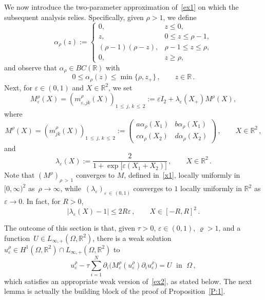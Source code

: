 \documentclass[AHL,Unicode,longabstracts,published]{cedram}
\newcommand{\bbR}{\mathbb{R}}
\begin{document}
We now introduce the two-parameter approximation of~\eqref{ex1} on which the subsequent analysis relies. Specifically, given $\rho>1$, we define
\begin{equation*}
\alpha_\rho(z):=
\left\{
\begin{array}{clll}
0, &z\leq 0,\\
z, &0\leq z\leq \rho-1,\\
(\rho-1)(\rho-z), &\rho-1\leq z\leq \rho,\\
0, &z\geq\rho,
\end{array}
\right.
\end{equation*}
and observe that $\alpha_\rho\in BC(\bbR)$ with
\begin{equation*}
0\le \alpha_\rho(z)\le \min\{\rho, z_+\}\,, \qquad z\in\bbR\,.
\end{equation*}
Next, for $\varepsilon\in (0,1)$ and $X\in\bbR^2$, we set
\begin{equation*}
M_{\varepsilon}^\rho(X) = \left(m_{\varepsilon, jk}^\rho(X)\right)_{1\,\le\,j,\,k\,\le\,2}:= \varepsilon I_2 + \lambda_\varepsilon(X_{+}) M^\rho(X),
\end{equation*}
where
\begin{equation}\label{momar}
M^\rho(X) = \left(m_{jk}^\rho(X)\right)_{1\,\le\, j,\,k\,\le\,2} :=
\begin{pmatrix}
a\alpha_\rho(X_1) & b\alpha_\rho(X_1) \\
c\alpha_\rho(X_2) & d\alpha_\rho(X_2)
\end{pmatrix}\,, \qquad X\in\bbR^2\,,
\end{equation}
and
\begin{equation*}
\lambda_\varepsilon(X) := \frac{2}{1+\exp{[\varepsilon (X_1+X_2)}]}\,, \qquad X\in\bbR^2\,.
\end{equation*}
Note that $(M^\rho)_{\rho\,>\,1}$ converges to $M$, defined in~\eqref{x1}, locally uniformly in $[0,\infty)^2$ as~$\rho\to\infty$, while~$(\lambda_\varepsilon)_{\varepsilon\,\in\,(0,1)}$ converges to $1$ locally uniformly in $\bbR^2$ as $\varepsilon\to 0$. In fact, for $R>0$,
\begin{equation}\label{UL}
|\lambda_\varepsilon(X) - 1| \le 2 R \varepsilon\,, \qquad X\in [-R,R]^2\,. 
\end{equation}

The outcome of this section is that, given $\tau>0$, $\varepsilon\in (0,1)$, $\varrho>1$, and a function~$U\in L_{\infty,+}(\Omega,\bbR^2)$, there is a weak solution $u_\varepsilon^\rho\in H^1(\Omega,\bbR^2)\cap L_{\infty,+}(\Omega,\bbR^2)$ to
\begin{equation*}
u_\varepsilon^\rho - \tau \sum_{i=1}^N\partial_i \big(M_\varepsilon^\rho(u_\varepsilon^\rho) \partial_i u_\varepsilon^\rho \big) = U \;\text{ in }\; \Omega\,,
\end{equation*}
which satisfies an appropriate weak version of~\eqref{ex2}, as stated below. The next lemma is actually the building block of the proof of Proposition~\ref{P:1}.
\end{document}
